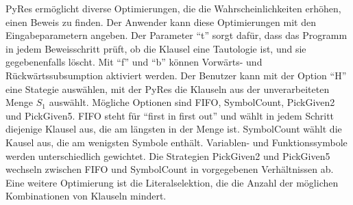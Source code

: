 PyRes ermöglicht diverse Optimierungen, die die Wahrscheinlichkeiten erhöhen, einen Beweis zu finden.
Der Anwender kann diese Optimierungen mit den Eingabeparametern angeben. Der Parameter "`t"' sorgt dafür, dass das Programm in jedem Beweisschritt prüft, ob die Klausel eine Tautologie ist, und sie gegebenenfalls löscht. Mit "`f"' und "`b"' können Vorwärts- und Rückwärtssubsumption aktiviert werden.
Der Benutzer kann mit der Option "`H"' eine Stategie auswählen, mit der PyRes die Klauseln aus der unverarbeiteten Menge $S_1$ auswählt. Mögliche Optionen sind FIFO, SymbolCount, PickGiven2 und PickGiven5. FIFO steht für "`first in first out"' und wählt in jedem Schritt diejenige Klausel aus, die am längsten in der Menge ist. SymbolCount wählt die Kausel aus, die am wenigsten Symbole enthält. Variablen- und Funktionssymbole werden unterschiedlich gewichtet. Die Strategien PickGiven2 und PickGiven5 wechseln zwischen FIFO und SymbolCount in vorgegebenen Verhältnissen ab. Eine weitere Optimierung ist die Literalselektion, die die Anzahl der möglichen Kombinationen von Klauseln mindert.